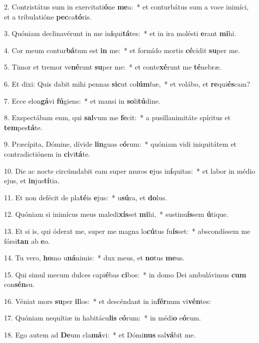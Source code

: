 2. Contristátus sum in exercitati\textbf{ó}ne \textbf{me}a:~*  et conturbátus sum a voce inimíci, et a tribulatióne \textbf{pec}ca\textbf{tó}ris.\

3. Quóniam declinavérunt in me in\textbf{i}qui\textbf{tá}tes:~*  et in ira molésti \textbf{e}rant \textbf{mi}hi.\

4. Cor meum contur\textbf{bá}tum est \textbf{in} me:~*  et formído mortis \textbf{cé}cidit \textbf{su}per me.\

5. Timor et tremor ve\textbf{né}runt \textbf{su}per me:~*  et conte\textbf{xé}runt me \textbf{té}nebræ.\

6. Et dixi: Quis dabit mihi pennas \textbf{sic}ut co\textbf{lúm}bæ,~*  et volábo, et \textbf{re}qui\textbf{és}cam?\

7. Ecce elon\textbf{gá}vi \textbf{fú}giens:~*  et mansi in \textbf{so}li\textbf{tú}dine.\

8. Exspectábam eum, qui \textbf{sal}vum me \textbf{fe}cit:~*  a pusillanimitáte spíritus et \textbf{tem}pes\textbf{tá}te.\

9. Præcípita, Dómine, dívide \textbf{lin}guas e\textbf{ó}rum:~*  quóniam vidi iniquitátem et contradictiónem in \textbf{ci}vi\textbf{tá}te.\

10. Die ac nocte circúmdabit eam super muros \textbf{e}jus in\textbf{í}quitas:~*  et labor in médio ejus, et \textbf{in}jus\textbf{tí}tia.\

11. Et non defécit de pla\textbf{té}is \textbf{e}jus:~*  u\textbf{sú}ra, et \textbf{do}lus.\

12. Quóniam si inimícus meus maledi\textbf{xís}set \textbf{mi}hi,~*  sustinu\textbf{ís}sem \textbf{ú}tique.\

13. Et si is, qui óderat me, super me magna lo\textbf{cú}tus fu\textbf{ís}set:~*  abscondíssem me fórsi\textbf{tan} ab \textbf{e}o.\

14. Tu vero, \textbf{ho}mo u\textbf{ná}nimis:~*  dux meus, et \textbf{no}tus \textbf{me}us.\

15. Qui simul mecum dulces capi\textbf{é}bas \textbf{ci}bos:~*  in domo Dei ambulávimus \textbf{cum} con\textbf{sén}su.\

16. Véniat mors \textbf{su}per \textbf{il}los:~*  et descéndant in in\textbf{fér}num vi\textbf{vén}tes:\

17. Quóniam nequítiæ in habitácu\textbf{lis} e\textbf{ó}rum:~*  in médi\textbf{o} e\textbf{ó}rum.\

18. Ego autem ad \textbf{De}um cla\textbf{má}vi:~*  et Dómi\textbf{nus} sal\textbf{vá}bit me.\


